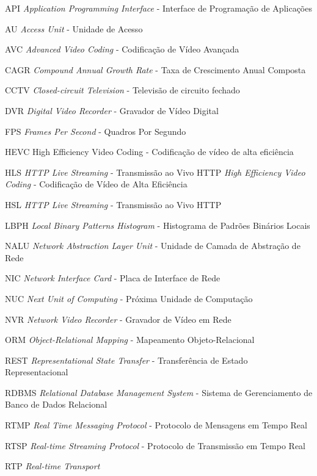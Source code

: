 \documentclass[12pt, %
openright, 
oneside, %
a4paper,    %
brazil]{facom-ufu-abntex2}
\begin{document}
\begin{siglas}
	\item[API] \textit{Application Programming Interface} - Interface de
	Programação de Aplicações
	\item[AU] \textit{Access Unit} - Unidade de Acesso
	\item[AVC] \textit{Advanced Video Coding} - Codificação de Vídeo
	Avançada \item[CAGR] \textit{Compound Annual Growth Rate} - Taxa de Crescimento
	Anual Composta \item[CCTV] \textit{Closed-circuit Television} -
	Televisão de circuito fechado \item[DVR] \textit{Digital Video Recorder} -
	Gravador de Vídeo Digital \item[FPS] \textit{Frames Per Second} - Quadros Por
	Segundo \item[HEVC] High Efficiency Video Coding - Codificação de vídeo de alta
	eficiência \item[HLS] \textit{HTTP Live Streaming} - Transmissão ao Vivo HTTP
	\textit{High Efficiency Video Coding} - Codificação de Vídeo de Alta Eficiência
	\item[HSL] \textit{HTTP Live Streaming} - Transmissão ao Vivo HTTP \item[LBPH]
	\textit{Local Binary Patterns Histogram} - Histograma de Padrões Binários
	Locais \item[NALU] \textit{Network Abstraction Layer Unit} - Unidade de Camada
	de Abstração de Rede \item[NIC] \textit{Network Interface Card} - Placa de
	Interface de Rede \item[NUC] \textit{Next Unit of Computing} - Próxima Unidade
	de Computação \item[NVR] \textit{Network Video Recorder} - Gravador de Vídeo em
	Rede \item[ORM] \textit{Object-Relational Mapping} - Mapeamento
	Objeto-Relacional \item[REST] \textit{Representational State Transfer} -
	Transferência de Estado Representacional  \item[RDBMS] \textit{Relational
		Database Management System} - Sistema de Gerenciamento de Banco de Dados
	Relacional \item[RTMP] \textit{Real Time Messaging Protocol} - Protocolo de
	Mensagens em Tempo Real \item[RTSP] \textit{Real-time Streaming Protocol} -
	Protocolo de Transmissão em Tempo Real \item[RTP] \textit{Real-time Transport
}
\end{siglas}
\end{document}
